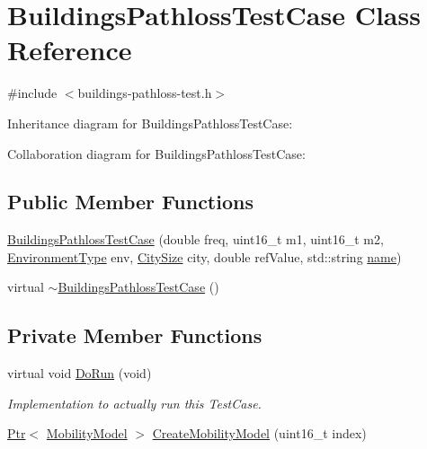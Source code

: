 \hypertarget{classBuildingsPathlossTestCase}{}\section{Buildings\+Pathloss\+Test\+Case Class Reference}
\label{classBuildingsPathlossTestCase}


{\ttfamily \#include $<$buildings-\/pathloss-\/test.\+h$>$}



Inheritance diagram for Buildings\+Pathloss\+Test\+Case\+:


Collaboration diagram for Buildings\+Pathloss\+Test\+Case\+:
\subsection*{Public Member Functions}
\begin{DoxyCompactItemize}
\item 
\hyperlink{classBuildingsPathlossTestCase_afb850e4b498c94255b4d2f00ba711c1d}{Buildings\+Pathloss\+Test\+Case} (double freq, uint16\+\_\+t m1, uint16\+\_\+t m2, \hyperlink{group__propagation_ga0e392ed771a28c92112047e63308a53a}{Environment\+Type} env, \hyperlink{group__propagation_ga29c9a1b1a58b6a56054ff5ea4c5a574d}{City\+Size} city, double ref\+Value, std\+::string \hyperlink{generate__test__data__lte__spectrum__model_8m_ab74e6bf80237ddc4109968cedc58c151}{name})
\item 
virtual \hyperlink{classBuildingsPathlossTestCase_acc8fe16fa0bf5caeaa978d645770a814}{$\sim$\+Buildings\+Pathloss\+Test\+Case} ()
\end{DoxyCompactItemize}
\subsection*{Private Member Functions}
\begin{DoxyCompactItemize}
\item 
virtual void \hyperlink{classBuildingsPathlossTestCase_a6b16dda55a96c818e4612ada692b6b35}{Do\+Run} (void)
\begin{DoxyCompactList}\small\item\em Implementation to actually run this Test\+Case. \end{DoxyCompactList}\item 
\hyperlink{classns3_1_1Ptr}{Ptr}$<$ \hyperlink{classns3_1_1MobilityModel}{Mobility\+Model} $>$ \hyperlink{classBuildingsPathlossTestCase_a22b970340b20ac349830e21a7b6abc6f}{Create\+Mobility\+Model} (uint16\+\_\+t index)
\end{DoxyCompactItemize}
